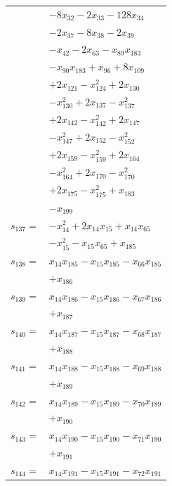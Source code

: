 \begin{longtable}{@{}r@{\;}l@{}}
 & \(\displaystyle -8x_{32} -2x_{33} -128x_{34}\) \\
 & \(\displaystyle -2x_{37} -8x_{38} -2x_{39}\) \\
 & \(\displaystyle -x_{42} -2x_{63} -x_{89}x_{183}\) \\
 & \(\displaystyle -x_{90}x_{183} +x_{96} +8x_{109}\) \\
 & \(\displaystyle +2x_{121} -x_{124}^{2} +2x_{130}\) \\
 & \(\displaystyle -x_{130}^{2} +2x_{137} -x_{137}^{2}\) \\
 & \(\displaystyle +2x_{142} -x_{142}^{2} +2x_{147}\) \\
 & \(\displaystyle -x_{147}^{2} +2x_{152} -x_{152}^{2}\) \\
 & \(\displaystyle +2x_{159} -x_{159}^{2} +2x_{164}\) \\
 & \(\displaystyle -x_{164}^{2} +2x_{170} -x_{170}^{2}\) \\
 & \(\displaystyle +2x_{175} -x_{175}^{2} +x_{183}\) \\
 & \(\displaystyle -x_{199}\) \\[3pt]
\(s_{137}=\) & \(\displaystyle -x_{14}^{2} +2x_{14}x_{15} +x_{14}x_{65}\) \\
 & \(\displaystyle -x_{15}^{2} -x_{15}x_{65} +x_{185}\) \\[3pt]
\(s_{138}=\) & \(\displaystyle x_{14}x_{185} -x_{15}x_{185} -x_{66}x_{185}\) \\
 & \(\displaystyle +x_{186}\) \\[3pt]
\(s_{139}=\) & \(\displaystyle x_{14}x_{186} -x_{15}x_{186} -x_{67}x_{186}\) \\
 & \(\displaystyle +x_{187}\) \\[3pt]
\(s_{140}=\) & \(\displaystyle x_{14}x_{187} -x_{15}x_{187} -x_{68}x_{187}\) \\
 & \(\displaystyle +x_{188}\) \\[3pt]
\(s_{141}=\) & \(\displaystyle x_{14}x_{188} -x_{15}x_{188} -x_{69}x_{188}\) \\
 & \(\displaystyle +x_{189}\) \\[3pt]
\(s_{142}=\) & \(\displaystyle x_{14}x_{189} -x_{15}x_{189} -x_{70}x_{189}\) \\
 & \(\displaystyle +x_{190}\) \\[3pt]
\(s_{143}=\) & \(\displaystyle x_{14}x_{190} -x_{15}x_{190} -x_{71}x_{190}\) \\
 & \(\displaystyle +x_{191}\) \\[3pt]
\(s_{144}=\) & \(\displaystyle x_{14}x_{191} -x_{15}x_{191} -x_{72}x_{191}\) \\

\end{longtable}
